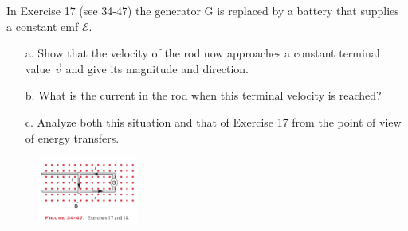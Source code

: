 \documentclass[11pt,letterpaper,boxed]{pset}
\begin{document}
    \begin{problem} [E34.18]
        In Exercise 17 (see 34-47) the generator G is replaced by a battery that supplies a constant emf $\mathscr{E}$. 
        
        \begin{enumerate}
            \item [a.] Show that the velocity of the rod now approaches a constant terminal value $\Vec{v}$ and give its magnitude and direction.
            \item [b.] What is the current in the rod when this terminal velocity is reached? 
            \item [c.] Analyze both this situation and that of Exercise 17 from the point of view of energy transfers.
        \end{enumerate}
    \end{problem}
    \begin{figure} [ht]
        \includegraphics[width=125px]{HW8Images/E34-17-18.png}
        \label{fig:E34-18}
    \end{figure}
\end{document}

